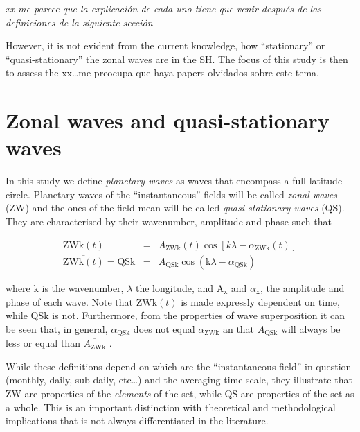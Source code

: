 \documentclass[draft,linenumbers]{agujournal2018}
\begin{document}
\emph{xx me parece que la explicación de cada uno tiene que venir
después de las definiciones de la siguiente sección}

However, it is not evident from the current knowledge, how
``stationary'' or ``quasi-stationary'' the zonal waves are in the SH.
The focus of this study is then to assess the xx\ldots{}me preocupa que
haya papers olvidados sobre este tema.

\section{Zonal waves and quasi-stationary waves}

In this study we define \emph{planetary waves} as waves that encompass a
full latitude circle. Planetary waves of the ``instantaneous'' fields
will be called \emph{zonal waves} (ZW) and the ones of the field mean
will be called \emph{quasi-stationary waves} (QS). They are
characterised by their wavenumber, amplitude and phase such that

\begin{linenomath*}
\begin{eqnarray}\label{eq:ZW}
\mathrm{ZWk}(t) & = & A_\mathrm{ZWk}(t)\cos \left [ k\lambda - \alpha_\mathrm{ZWk}(t) \right ] \\ 
\overline{\mathrm{ZWk}(t)} = \mathrm{QSk} & = & A_\mathrm{QSk}\cos \left (  \mathrm{k}\lambda - \alpha_\mathrm{QSk} \right ) \label{eq:QS}
\end{eqnarray}
\end{linenomath*}

where \(\mathrm{k}\) is the wavenumber, \(\lambda\) the longitude, and
\(\mathrm{A_{x}}\) and \(\alpha_\mathrm{x}\), the amplitude and phase of
each wave. Note that \(\mathrm{ZWk}(t)\) is made expressly dependent on
time, while \(\mathrm{QSk}\) is not. Furthermore, from the properties of
wave superposition it can be seen that, in general,
\(\alpha_\mathrm{QSk}\) does not equal
\(\overline{\alpha_\mathrm{ZWk}}\) an that \(A_\mathrm{QSk}\) will
always be less or equal than \(\overline{A_\mathrm{ZWk}}\)
\citep{Pain2005}.

While these definitions depend on which are the ``instantaneous field''
in question (monthly, daily, sub daily, etc\ldots{}) and the averaging
time scale, they illustrate that ZW are properties of the
\emph{elements} of the set, while QS are properties of the set as a
whole. This is an important distinction with theoretical and
methodological implications that is not always differentiated in the
literature.
\end{document}
